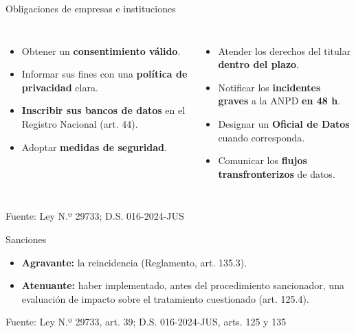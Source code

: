 \documentclass[aspectratio=169,11pt]{beamer}
\newcommand{\fuente}[1]{\par\vfill\hfill{\tiny\color{gray}Fuente: #1}}
\begin{document}
\begin{frame}{Obligaciones de empresas e instituciones}
\begin{columns}[T]
\small
\begin{itemize}
  \item[\color{verde}$\checkmark$] Obtener un \textbf{consentimiento válido}.
  \item[\color{verde}$\checkmark$] Informar sus fines con una \textbf{política de privacidad} clara.
  \item[\color{verde}$\checkmark$] \textbf{Inscribir sus bancos de datos} en el Registro Nacional (art. 44).
  \item[\color{verde}$\checkmark$] Adoptar \textbf{medidas de seguridad}.
\end{itemize}
\small
\begin{itemize}
  \item[\color{verde}$\checkmark$] Atender los derechos del titular \textbf{dentro del plazo}.
  \item[\color{verde}$\checkmark$] Notificar los \textbf{incidentes graves} a la ANPD \textbf{en 48 h}.
  \item[\color{verde}$\checkmark$] Designar un \textbf{Oficial de Datos} cuando corresponda.
  \item[\color{verde}$\checkmark$] Comunicar los \textbf{flujos transfronterizos} de datos.
\end{itemize}
\end{columns}
\fuente{Ley N.º 29733; D.S. 016-2024-JUS}
\end{frame}

\begin{frame}{Sanciones}
\begin{center}
\end{center}
\small
\begin{itemize}
  \item \textbf{Agravante:} la reincidencia (Reglamento, art. 135.3).
  \item \textbf{Atenuante:} haber implementado, antes del procedimiento sancionador, una evaluación de impacto sobre el tratamiento cuestionado (art. 125.4).
\end{itemize}
\fuente{Ley N.º 29733, art. 39; D.S. 016-2024-JUS, arts. 125 y 135}
\end{frame}
\end{document}
